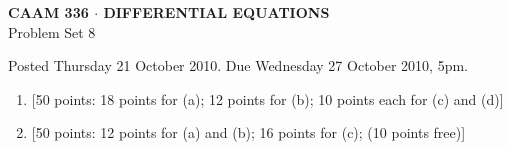 \documentclass[10pt]{article}
\begin{document}

\begin{center}
\large \textsf{\textbf{CAAM 336 $\cdot$ DIFFERENTIAL EQUATIONS}\\[0.5em]
 Problem Set 8 }
\end{center}

Posted Thursday 21 October 2010.  Due Wednesday 27 October 2010, 5pm.

\begin{enumerate}
\item {[50 points: 18 points for (a); 12 points for (b); 10 points each for (c) and (d)]}\\  

\item {[50 points: 12 points for (a) and (b); 16 points for (c); (10 points free)]}\\  
\end{enumerate}
\end{document}
